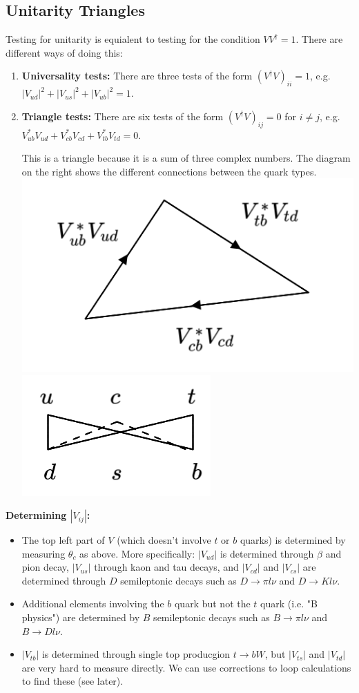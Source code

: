 \subsection{Unitarity Triangles}
%
Testing for unitarity is equialent to testing for the condition $VV^\dagger =1$. There are different ways of doing this:
\begin{enumerate}
\item \textbf{Universality tests: }
There are three tests of the form $(V^\dagger V)_{ii}=1$, e.g.
$|V_{ud}|^2 +|V_{us}|^2 +|V_{ub}|^2 = 1$.
\item \textbf{Triangle tests: }
There are six tests of the form $(V^\dagger V)_{ij}=0$ for $i \neq j$, e.g.
$V^*_{ub}V_{ud} + V^*_{cb}V_{cd} + V^*_{tb}V_{td} = 0$. 

This is a triangle because it is a sum of three complex numbers. The diagram on the right shows the different connections between the quark types.
\newline
\includegraphics[width=0.6\linewidth]{figs/47a.png}
\includegraphics[width=0.3\linewidth]{figs/47b.png}
\end{enumerate}
\textbf{Determining $|V_{ij}|$: }
\begin{itemize}
\item The top left part of $V$ (which doesn't involve $t$ or $b$ quarks) is determined by measuring $\theta_c$ as above. More specifically: $|V_{ud}|$ is determined through $\beta$ and pion decay, $|V_{us}|$ through kaon and tau decays, and $|V_{cd}|$ and $|V_{cs}|$ are determined through $D$ semileptonic decays such as $D \to \pi l \nu$ and $D \to K l \nu$.
\item Additional elements involving the $b$ quark but not the $t$ quark (i.e. "B physics") are determined by $B$ semileptonic decays such as $B \to \pi l \nu$ and $B \to D l \nu$. 
\item $|V_{tb}|$ is determined through single top producgion $t \to bW$, but $|V_{ts}|$ and $|V_{td}|$ are very hard to measure directly. We can use corrections to loop calculations to find these (see later).
\end{itemize}

